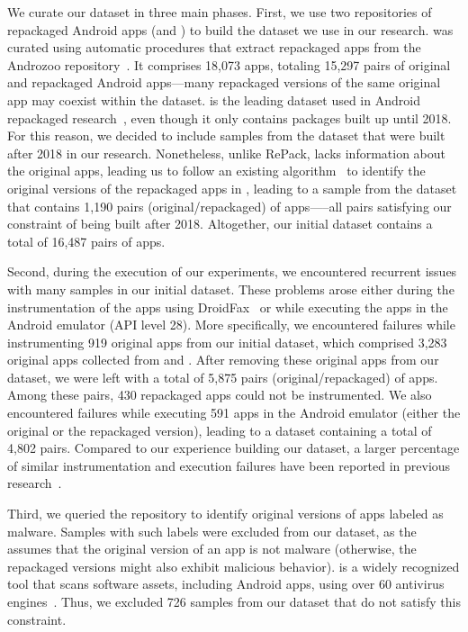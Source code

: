 We curate our dataset in three main phases. 
First, we use two repositories of repackaged Android apps (\repack and \amc) to build the
dataset we use in our research. \repack was curated using automatic procedures that extract repackaged apps from the Androzoo
repository~\cite{DBLP:conf/msr/AllixBKT16}. It comprises 18,073 apps, totaling 15,297 pairs of original and repackaged Android
apps---many repackaged versions of the same original app may coexist within the \repack dataset. \repack is the leading dataset used in Android
repackaged research~\cite{DBLP:journals/ese/KhanmohammadiEH19}, even though it only contains packages built up until 2018. For this reason, we decided to include samples from the \amc
dataset that were built after 2018 in our research. Nonetheless, unlike RePack, \amc lacks information about the original apps, leading
us to follow an existing algorithm~\cite{DBLP:journals/tse/LiBK21} to identify the original versions of the repackaged apps in \amc,
leading to a sample from the \amc dataset that contains 1,190 pairs (original/repackaged) of apps—--all pairs
satisfying our constraint of being built after 2018. Altogether, our initial dataset contains a total of 16,487 pairs of apps.

Second, during the execution of our experiments, we encountered recurrent issues with many samples in our initial dataset.
These problems arose either during the instrumentation of the apps using DroidFax~\cite{DBLP:conf/icsm/CaiR17a}
or while executing the apps in the Android emulator (API level 28).
More specifically, we encountered failures while instrumenting 919 original apps from our initial dataset, which comprised 3,283 original apps collected from \repack and \amc.
After removing these original apps from our dataset, we were left with a total of 5,875 pairs (original/repackaged) of apps. Among these pairs,
430 repackaged apps could not be instrumented. We also encountered failures while executing 591 apps in the Android emulator (either the original or the
repackaged version), leading to
a dataset containing a total of 4,802 pairs. Compared to our experience building our dataset,
a larger percentage of similar instrumentation and execution failures have been reported in previous research~\cite{DBLP:conf/wcre/BaoLL18}.

Third, we queried the \vt repository
to identify original versions of apps labeled as malware. Samples with such labels were excluded from our dataset,
as the \mas assumes that the original version of an app is not malware (otherwise, the repackaged versions might
also exhibit malicious behavior). \vt is a widely recognized tool that scans software assets, including Android apps,
using over 60 antivirus engines~\cite{DBLP:journals/ese/KhanmohammadiEH19}. Thus, we excluded 726 samples from our dataset that
do not satisfy this constraint.

